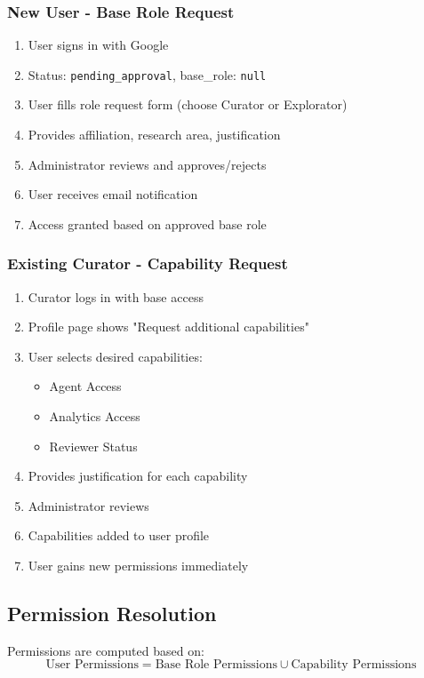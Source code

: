 \documentclass[12pt,a4paper]{article}
\begin{document}
\subsubsection{New User - Base Role Request}
\begin{enumerate}
    \item User signs in with Google
    \item Status: \texttt{pending\_approval}, base\_role: \texttt{null}
    \item User fills role request form (choose Curator or Explorator)
    \item Provides affiliation, research area, justification
    \item Administrator reviews and approves/rejects
    \item User receives email notification
    \item Access granted based on approved base role
\end{enumerate}

\subsubsection{Existing Curator - Capability Request}
\begin{enumerate}
    \item Curator logs in with base access
    \item Profile page shows "Request additional capabilities"
    \item User selects desired capabilities:
    \begin{itemize}
        \item Agent Access
        \item Analytics Access
        \item Reviewer Status
    \end{itemize}
    \item Provides justification for each capability
    \item Administrator reviews
    \item Capabilities added to user profile
    \item User gains new permissions immediately
\end{enumerate}

\subsection{Permission Resolution}

Permissions are computed based on:
\begin{equation}
\text{User Permissions} = \text{Base Role Permissions} \cup \text{Capability Permissions}
\end{equation}
\end{document}
